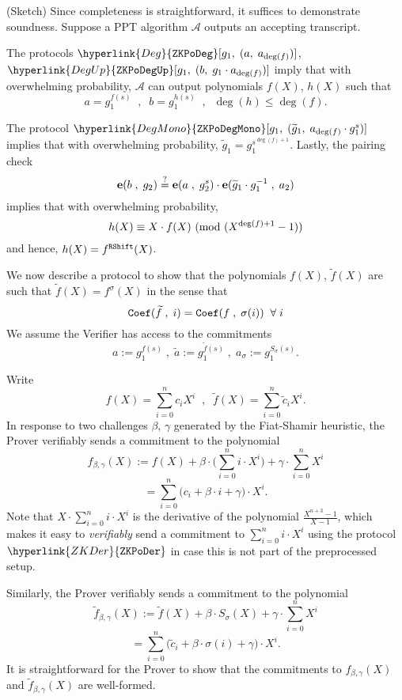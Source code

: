 \documentclass[11pt, lettersize, notitlepage, leqno, footskip=0.6cm]{article}
\newcommand{\wti}{\widetilde}
\newcommand{\mc}{\mathcal}
\newcommand{\mbf}{\mathbf}
\newcommand{\be}{\beta}
\newcommand{\vs}{\vspace{-0.15cm}}
\newcommand{\noin}{\noindent}
\newcommand{\op}{overwhelming probability}
\newcommand{\sta}{\stackrel{?}{=}}
\newcommand{\Mod}[1]{\ (\mathrm{mod}\ #1)}
\newcommand{\e}{\mbf{e}}
\numberwithin{equation}{section}
\begin{document}
\begin{prf} (Sketch) Since completeness is straightforward, it suffices to demonstrate soundness. Suppose a PPT algorithm $\mc{A}$ outputs an accepting transcript.

The protocols $\hyperlink{Deg}{\tt{ZKPoDeg}}[g_1,\;(a,\;a_{\deg(f)})]$, $\hyperlink{DegUp}{\tt{ZKPoDegUp}}[g_1,\;(b,\;g_1\cdot a_{\deg(f)})]$ imply that with \op, $\mc{A}$ can output polynomials $f(X)$, $h(X)$ such that \vs $$ a = g_1^{f(s)}\;\;,\;\;b = g_1^{h(s)} \;\;,\;\;\deg(h)\leq \deg(f).$$

\noin The protocol $\hyperlink{DegMono}{\tt{ZKPoDegMono}}[g_1,\;(\wti{g}_1,\;a_{\deg(f)}\cdot g_1^{s})]$ implies that with \op, $\wti{g}_1 = g_1^{s^{\deg(f)+1}}$. Lastly, the pairing check \vs $$ \e(b\;,\;g_2)\sta \e(a\;,\;g_2^s)\cdot \e(\wti{g}_1\cdot g_1^{-1}\;,\;a_2) \vs $$ implies that with \op, \vs $$ h(X)\equiv X\cdot f(X)\Mod{(X^{\deg(f)+1}-1)}  \vs $$ and hence, $h(X) = f^{\tt{RShift}}(X)$. \end{prf}




We now describe a protocol to show that the polynomials $f(X)$, $\wti{f}(X)$ are such that $\wti{f}(X) = f^{\sigma}(X)$ in the sense that \vs $$ {\tt{Coef}}(\wti{f}\;,\;i) =  {\tt{Coef}}(f\;,\;\sigma(i))\;\;\forall\;i  $$ We assume the Verifier has access to the commitments \vs $$a:= g_1^{f(s)}\;,\; \wti{a}:= g_1^{\wti{f}(s)}\;,\;a_{\sigma}:= g_1^{S_{\sigma}(s)}. $$




\noin Write \vs $$f(X) = \sum\limits_{i=0}^{n} c_i X^i\;\;,\;\; \wti{f}(X) = \sum\limits_{i=0}^{n} \wti{c}_i X^i.$$ In response to two challenges $\be$, $\gamma$ generated by the Fiat-Shamir heuristic, the Prover verifiably sends a commitment to the polynomial \vspace{-2mm} $$ f_{\be,\gamma}(X):= f(X)+\be\cdot \big(\sum\limits_{i=0}^{n} i\cdot X^i\big)+\gamma\cdot \sum\limits_{i=0}^{n} X^i $$ \vspace{-3mm}  $$ = \sum\limits_{i=0}^{n} \big(c_i+\be\cdot i + \gamma\big)\cdot X^i. $$ Note that $X\cdot \sum_{i=0}^{n} i\cdot X^i$ is the derivative of the polynomial $\frac{X^{n+3}-1}{X-1}$, which makes it easy to \textit{verifiably} send a commitment to $\sum_{i=0}^{n} i\cdot X^i$ using the protocol $\hyperlink{ZKDer}{\tt{{ZKPoDer}}}$ in case this is not part of the preprocessed setup.

Similarly, the Prover verifiably sends a commitment to the polynomial \vs $$ \wti{f}_{\be,\gamma}(X):= \wti{f}(X)+\be\cdot S_{\sigma}(X)+\gamma\cdot \sum\limits_{i=0}^{n}  X^i $$ \vspace{-3mm}  $$ = \sum\limits_{i=0}^{n} \big(\wti{c}_i+\be\cdot \sigma(i) + \gamma\big)\cdot X^i. $$ It is straightforward for the Prover to show that the commitments to $f_{\be,\gamma}(X)$ and $\wti{f}_{\be,\gamma}(X)$ are well-formed.
\end{document}
